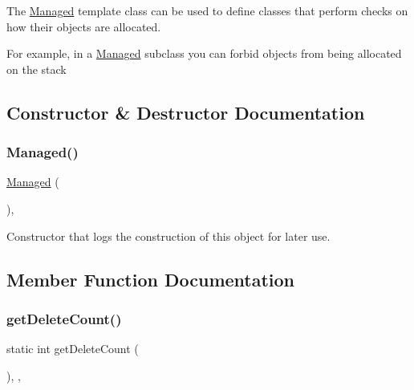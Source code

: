 The \mbox{\hyperlink{classManaged}{Managed}} template class can be used to define classes that perform checks on how their objects are allocated. 

For example, in a \mbox{\hyperlink{classManaged}{Managed}} subclass you can forbid objects from being allocated on the stack 

\subsection{Constructor \& Destructor Documentation}
\mbox{\label{classManaged_a0be75425cb8e4ae478e48c46fccc4b69}} 
\subsubsection{\texorpdfstring{Managed()}{Managed()}}
{\footnotesize\ttfamily \mbox{\hyperlink{classManaged}{Managed}} (\begin{DoxyParamCaption}{ }\end{DoxyParamCaption})\hspace{0.3cm}{\ttfamily [inline]}, {\ttfamily [protected]}}



Constructor that logs the construction of this object for later use. 



\subsection{Member Function Documentation}
\mbox{\label{classManaged_add9e9d39e8a6f6ee972898d928b65ad3}} 
\subsubsection{\texorpdfstring{get\+Delete\+Count()}{getDeleteCount()}}
{\footnotesize\ttfamily static int get\+Delete\+Count (\begin{DoxyParamCaption}{ }\end{DoxyParamCaption})\hspace{0.3cm}{\ttfamily [inline]}, {\ttfamily [static]}, {\ttfamily [protected]}}




